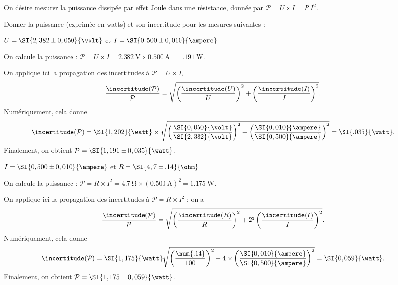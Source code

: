 \debutEntrainement

On désire mesurer la puissance dissipée par effet Joule dans une résistance, donnée par  \( \mathcal P = U\times I  = R\,I^2 \).

Donner la puissance (exprimée en watts) et son incertitude pour les mesures suivantes :


\begin{enonce}
  \( U= \SI{2,382\pm 0,050}{\volt} \) \quad et \quad\( I= \SI{0,500\pm 0,010}{\ampere} \) 
\end{enonce}


\begin{corrige}
On calcule la puissance : \( \mathcal P = U\times I = \SI{2,382}{\volt} \times \SI{0,500}{\ampere}= \SI{1,191}{\watt}\).
  
On applique ici la propagation des incertitudes à \( \mathcal P = U\times I \),
\[
\frac{\incertitude(\mathcal P)}{\mathcal P}=\sqrt{\left(\frac{\incertitude(U)}{U}\right)^2 + \left(\frac{\incertitude(I)}{I}\right)^2}.
\]
  Numériquement, cela donne 
\[
\incertitude(\mathcal P)=\SI{1,202}{\watt} \times \sqrt{\left(\frac{\SI{0,050}{\volt}}{\SI{2,382}{\volt}}\right)^2 + \left(\frac{\SI{ 0,010}{\ampere}}{\SI{0,500}{\ampere}}\right)^2}=\SI{.035}{\watt}.
  \]
  Finalement, on obtient \( \mathcal P =  \SI{1,191\pm0,035}{\watt} \).
\end{corrige}




\begin{enonce}
  \( I= \SI{0,500\pm 0,010}{\ampere} \) \quad et \quad  \(R=\SI{4,7\pm.14}{\ohm}\)
\end{enonce}


\begin{corrige}
  On calcule la puissance :  \( \mathcal P = R\times I^2 = \SI{4,7}{\ohm} \times (\SI{0,500}{\ampere})^2= \SI{1,175}{\watt}\).
  
  On applique ici la propagation des incertitudes à \( \mathcal P = R\times I^2 \) : on a
  \[
    \frac{\incertitude(\mathcal P)}{\mathcal P}=\sqrt{\left(\frac{\incertitude(R)}{R}\right)^2 + 2^2\left(\frac{\incertitude(I)}{I}\right)^2}.
  \]
Numériquement, cela donne \minusMedskip
\[
\incertitude(\mathcal P)=
\SI{1,175}{\watt}\sqrt{
\left(\frac{\num{.14}}{100}\right)^2 + 
4\times\left(\frac{\SI{ 0,010}{\ampere}}{\SI{0,500}{\ampere}}\right)^2
}=\SI{0,059}{\watt}.
\]
Finalement, on obtient \( \mathcal P =  \SI{1,175\pm0,059}{\watt} \).
\end{corrige}

